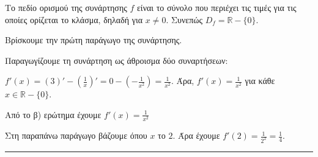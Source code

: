 \begin{alist}
\item Το πεδίο ορισμού της συνάρτησης $f$ είναι το σύνολο που περιέχει τις τιμές για τις οποίες ορίζεται το κλάσμα, δηλαδή για $x \neq 0$. Συνεπώς $D_f = \mathbb{R} - \{0\}$.

\item Βρίσκουμε την πρώτη παράγωγο της συνάρτησης.

Παραγωγίζουμε τη συνάρτηση ως άθροισμα δύο συναρτήσεων:

$f'(x) = (3)' - \left(\frac{1}{x}\right)' = 0 - \left(-\frac{1}{x^2}\right) = \frac{1}{x^2}$. Άρα, $f'(x) = \frac{1}{x^2}$ για κάθε $x \in \mathbb{R} - \{0\}$.

\item Από το β) ερώτημα έχουμε $f'(x) = \frac{1}{x^2}$

Στη παραπάνω παράγωγο βάζουμε όπου $x$ το $2$. Άρα έχουμε $f'(2) = \frac{1}{2^2} = \frac{1}{4}$.
\end{alist}
\vspace{6mm}
\noindent\rule{\textwidth}{0.4pt}
\vspace{6mm}

